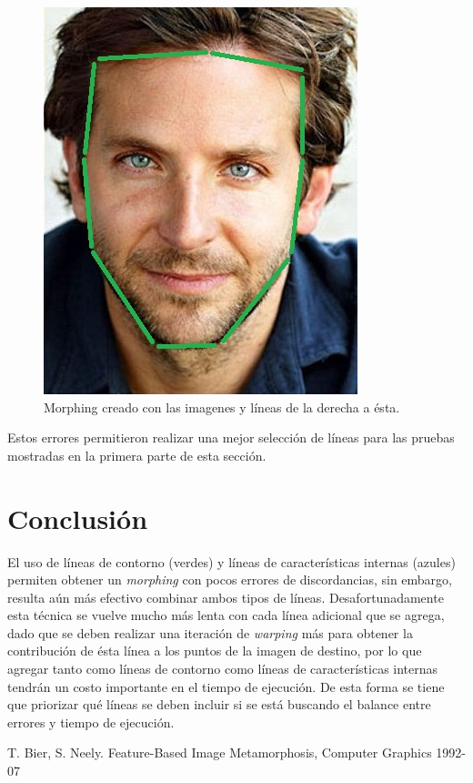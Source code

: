 \documentclass[conference]{IEEEtran}
\begin{document}
\begin{figure}[H]
\begin{multicols}{3}
    \includegraphics[width=0.65\linewidth]{errors/02/2 lines.jpg} \par
   
\end{multicols}
\caption{Morphing creado con las imagenes y líneas de la derecha a ésta.}
\end{figure}	
	
	Estos errores permitieron realizar una mejor selección de líneas para las pruebas mostradas en la primera parte de esta sección.

\section*{Conclusión}
	El uso de líneas de contorno (verdes) y líneas de características internas (azules) permiten obtener un \textit{morphing} con pocos errores de discordancias, sin embargo, resulta aún más efectivo combinar ambos tipos de líneas. Desafortunadamente esta técnica se vuelve mucho más lenta con cada línea adicional que se agrega, dado que se deben realizar una iteración de \textit{warping} más para obtener la contribución de ésta línea a los puntos de la imagen de destino, por lo que agregar tanto como líneas de contorno como líneas de características internas tendrán un costo importante en el tiempo de ejecución. De esta forma se tiene que priorizar qué líneas se deben incluir si se está buscando el balance entre errores y tiempo de ejecución.
		
	
\begin{thebibliography}{99}
	  T. Bier, S. Neely. Feature-Based Image Metamorphosis, Computer Graphics 1992-07

\end{thebibliography}
\end{document}
